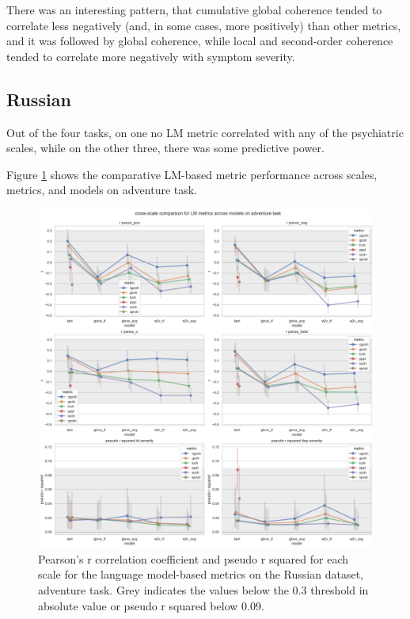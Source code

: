 There was an interesting pattern, that cumulative global coherence tended to correlate less negatively (and, in some cases, more positively) than other metrics, and it was followed by global coherence, while local and second-order coherence tended to correlate more negatively with symptom severity.

\subsection{Russian}
Out of the four tasks, on one no LM metric correlated with any of the psychiatric scales, while on the other three, there was some predictive power.

\clearpage
Figure \ref{fig:results:lm:ru:ad} shows the comparative LM-based metric performance across scales, metrics, and models on adventure task.

\begin{figure}[ht!]
    \includegraphics[width=1.1\textwidth, center]{Figures/chapter_4/LM/ru_adventure_scale_r.png} 
\captionsetup{width=\textwidth}
\caption[LM Metrics: Russian, Adventure Task]{\label{fig:results:lm:ru:ad} Pearson's r correlation coefficient and pseudo r squared for each scale for the language model-based metrics on the Russian dataset, adventure task. Grey indicates the values below the 0.3 threshold in absolute value or pseudo r squared below 0.09.}
\end{figure}

